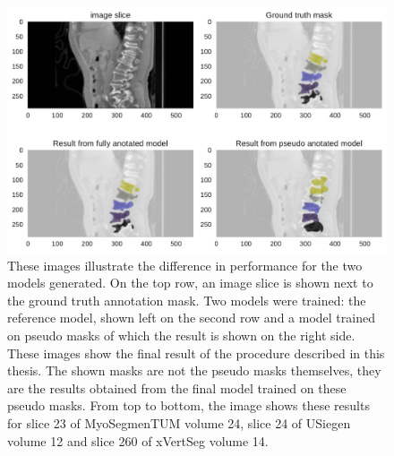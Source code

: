 \begin{figure}
    \vspace{2 mm}
    \begin{minipage}{.99\textwidth}
        \includegraphics[width=.99\textwidth]{images/fullvsPseudo_xVertSeg_014_260.pdf}
    \end{minipage}
    \caption{These images illustrate the difference in performance for the two models generated. On the top row, an image slice is shown next to the ground truth annotation mask.
    Two models were trained: the reference model, shown left on the second row and a model trained on pseudo masks of which the result is shown on the right side. 
    These images show the final result of the procedure described in this thesis. The shown masks are not the pseudo masks themselves, they are the results obtained from the final model trained on these pseudo masks.
    From top to bottom, the image shows these results for slice 23 of MyoSegmenTUM volume 24, slice 24 of USiegen volume 12 and slice 260 of xVertSeg volume 14. 
    \protect
    \label{fig:fullvsPseudo}}
\end{figure}

